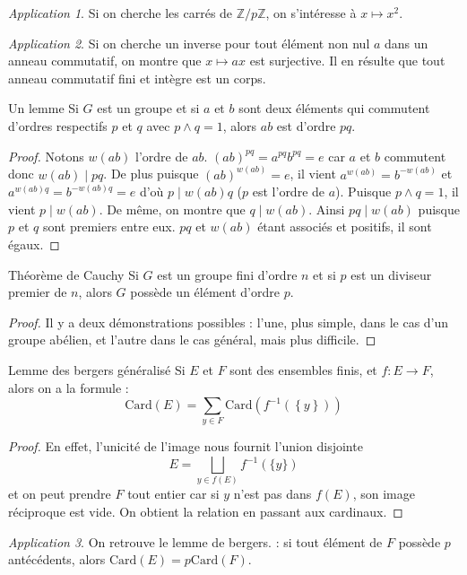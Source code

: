 \documentclass[french]{book}
\newcommand{\Z}{\mathbb{Z}}
\newcommand{\inv}{^{-1}}
\newcommand{\card}{\text{Card}}
\theoremstyle{plain}
\theoremstyle{definition}
\theoremstyle{remark}
\newtheorem*{app}{Application}
\begin{document}
\begin{app}
	Si on cherche les carrés de $\Z/p\Z$, on s'intéresse à $x\mapsto x^2$.
\end{app}
\begin{app}
	Si on cherche un inverse pour tout élément non nul $a$ dans un anneau commutatif, on montre que $x\mapsto ax$ est surjective. Il en résulte que tout anneau commutatif fini et intègre est un corps.
\end{app}
\begin{AS}{Un lemme} Si $G$ est un groupe et si $a$ et $b$ sont deux éléments qui commutent d’ordres respectifs $p$ et $q$ avec $p\wedge q=1$, alors $ab$ est d’ordre $pq$.
\end{AS}
\begin{proof}
	Notons $w(ab)$ l’ordre de $ab$. $(ab)^{pq} = a^{pq}b^{pq} = e$ car $a$ et $b$ commutent donc $w(ab)\mid pq$. De plus puisque $(ab)^{w(ab)}= e$, il vient $a^{w(ab)} = b^{-w(ab)}$ et $a^{w(ab)q} = b^{-w(ab)q} = e$ d’où $p\mid w(ab)q$ ($p$ est l’ordre de $a$). Puisque $p\wedge q=1$, il vient $p\mid w(ab)$. De même, on montre que $q\mid w(ab)$. Ainsi $pq\mid w(ab)$ puisque $p$ et $q$ sont premiers entre eux. $pq$ et $w(ab)$ étant associés et positifs, il sont égaux.
\end{proof}
\begin{AS}{Théorème de Cauchy} Si $G$ est un groupe fini d’ordre $n$ et si $p$ est un diviseur premier de $n$, alors $G$ possède un élément d’ordre $p$.
\end{AS}
\begin{proof}
	Il y a deux démonstrations possibles : l’une, plus simple, dans le cas d’un groupe abélien, et l’autre dans le cas général, mais plus difficile.	
\end{proof}
\begin{AS}{Lemme des bergers généralisé} Si $E$ et $F$ sont des ensembles finis, et $f:E\to F$, alors on a la formule : $$\card(E)=\sum_{y\in F}\card\left(f\inv(\left\{y\right\})\right)$$
\end{AS}
\begin{proof}
	En effet, l'unicité de l'image nous fournit l'union disjointe $$E=\bigsqcup_{y\in f(E)}f\inv(\{y\})$$ et on peut prendre $F$ tout entier car si $y$ n'est pas dans $f(E)$, son image réciproque est vide. On obtient la relation en passant aux cardinaux.
\end{proof}
\begin{app}
	On retrouve le lemme de bergers. : si tout élément de $F$ possède $p$ antécédents, alors $\card(E)=p\card(F)$.
\end{app} 
\end{document}
